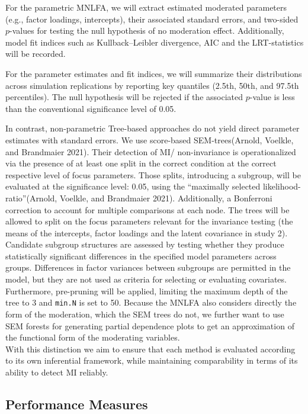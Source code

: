 \documentclass[
  man,
  floatsintext]{apa7}
\begin{document}
For the parametric MNLFA, we will extract estimated moderated parameters
(e.g., factor loadings, intercepts), their associated standard errors,
and two-sided \(p\)-values for testing the null hypothesis of no
moderation effect. Additionally, model fit indices such as
Kullback--Leibler divergence, AIC and the LRT-statistics will be
recorded.

For the parameter estimates and fit indices, we will summarize their
distributions across simulation replications by reporting key quantiles
(2.5th, 50th, and 97.5th percentiles). The null hypothesis will be
rejected if the associated \(p\)-value is less than the conventional
significance level of 0.05.

In contrast, non-parametric Tree-based approaches do not yield direct
parameter estimates with standard errors. We use score-based
SEM-trees(Arnold, Voelkle, and Brandmaier 2021). Their detection of MI/
non-invariance is operationalized via the presence of at least one split
in the correct condition at the correct respective level of focus
parameters. Those splits, introducing a subgroup, will be evaluated at
the significance level: 0.05, using the ``maximally selected
likelihood-ratio''(Arnold, Voelkle, and Brandmaier 2021). Additionally,
a Bonferroni correction to account for multiple comparisons at each
node. The trees will be allowed to split on the focus parameters
relevant for the invariance testing (the means of the intercepts, factor
loadings and the latent covariance in study 2). Candidate subgroup
structures are assessed by testing whether they produce statistically
significant differences in the specified model parameters across groups.
Differences in factor variances between subgroups are permitted in the
model, but they are not used as criteria for selecting or evaluating
covariates. Furthermore, pre-pruning will be applied, limiting the
maximum depth of the tree to 3 and \texttt{min.N} is set to 50. Because
the MNLFA also considers directly the form of the moderation, which the
SEM trees do not, we further want to use SEM forests for generating
partial dependence plots to get an approximation of the functional form
of the moderating variables.\\
With this distinction we aim to ensure that each method is evaluated
according to its own inferential framework, while maintaining
comparability in terms of its ability to detect MI reliably.

\subsection{Performance Measures}\label{performance-measures}
\end{document}
